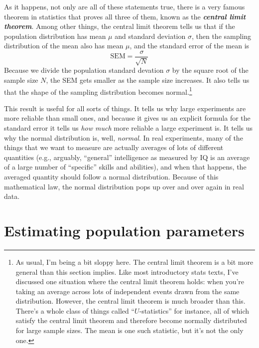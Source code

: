 \documentclass[spanish,]{book}
\let\rmarkdownfootnote\footnote%
\def\footnote{\protect\rmarkdownfootnote}
\begin{document}
As it happens, not only are all of these statements true, there is a
very famous theorem in statistics that proves all three of them, known
as the \textbf{\emph{central limit theorem}}. Among other things, the
central limit theorem tells us that if the population distribution has
mean \(\mu\) and standard deviation \(\sigma\), then the sampling
distribution of the mean also has mean \(\mu\), and the standard error
of the mean is \[
\mbox{SEM} = \frac{\sigma}{ \sqrt{N} }
\] Because we divide the population standard devation \(\sigma\) by the
square root of the sample size \(N\), the SEM gets smaller as the sample
size increases. It also tells us that the shape of the sampling
distribution becomes normal.\footnote{As usual, I'm being a bit sloppy
  here. The central limit theorem is a bit more general than this
  section implies. Like most introductory stats texts, I've discussed
  one situation where the central limit theorem holds: when you're
  taking an average across lots of independent events drawn from the
  same distribution. However, the central limit theorem is much broader
  than this. There's a whole class of things called ``\(U\)-statistics''
  for instance, all of which satisfy the central limit theorem and
  therefore become normally distributed for large sample sizes. The mean
  is one such statistic, but it's not the only one.}

This result is useful for all sorts of things. It tells us why large
experiments are more reliable than small ones, and because it gives us
an explicit formula for the standard error it tells us \emph{how much}
more reliable a large experiment is. It tells us why the normal
distribution is, well, \emph{normal}. In real experiments, many of the
things that we want to measure are actually averages of lots of
different quantities (e.g., arguably, ``general'' intelligence as
measured by IQ is an average of a large number of ``specific'' skills
and abilities), and when that happens, the averaged quantity should
follow a normal distribution. Because of this mathematical law, the
normal distribution pops up over and over again in real data.

\section{Estimating population parameters}\label{pointestimates}
\end{document}
